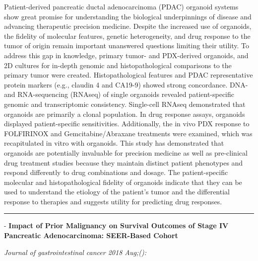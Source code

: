 \documentclass[]{article}
\begin{document}
Patient-derived pancreatic ductal adenocarcinoma (PDAC) organoid systems
show great promise for understanding the biological underpinnings of
disease and advancing therapeutic precision medicine. Despite the
increased use of organoids, the fidelity of molecular features, genetic
heterogeneity, and drug response to the tumor of origin remain important
unanswered questions limiting their utility. To address this gap in
knowledge, primary tumor- and PDX-derived organoids, and 2D cultures for
in-depth genomic and histopathological comparisons to the primary tumor
were created. Histopathological features and PDAC representative protein
markers (e.g., claudin 4 and CA19-9) showed strong concordance. DNA- and
RNA-sequencing (RNAseq) of single organoids revealed patient-specific
genomic and transcriptomic consistency. Single-cell RNAseq demonstrated
that organoids are primarily a clonal population. In drug response
assays, organoids displayed patient-specific sensitivities.
Additionally, the in vivo PDX response to FOLFIRINOX and
Gemcitabine/Abraxane treatments were examined, which was recapitulated
in vitro with organoids. This study has demonstrated that organoids are
potentially invaluable for precision medicine as well as pre-clinical
drug treatment studies because they maintain distinct patient phenotypes
and respond differently to drug combinations and dosage. The
patient-specific molecular and histopathological fidelity of organoids
indicate that they can be used to understand the etiology of the
patient's tumor and the differential response to therapies and suggests
utility for predicting drug responses.

{}

{}

\begin{center}\rule{0.5\linewidth}{\linethickness}\end{center}

 - \textbf{Impact of Prior Malignancy on Survival Outcomes of Stage IV
Pancreatic Adenocarcinoma: SEER-Based Cohort}

\emph{Journal of gastrointestinal cancer 2018 Aug;():}
\end{document}
